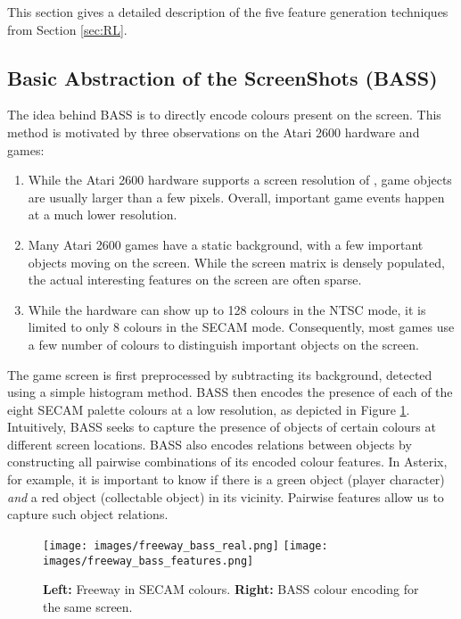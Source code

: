 \documentclass[twoside,11pt]{article}
\newcommand{\gamename}[1]{{\sc #1}}
\begin{document}
This section gives a detailed description of the five feature generation techniques from Section \ref{sec:RL}. 

\subsection{Basic Abstraction of the ScreenShots (BASS)}
\label{sec:agents:rl:bass}
The idea behind BASS is to directly encode colours present on the screen. This method is motivated by three observations on the Atari 2600 hardware and games:
\begin{enumerate}
	\item While the Atari 2600 hardware supports a screen resolution of , game objects are usually larger than a few pixels. Overall, important game events happen at a much lower resolution.
	\item Many Atari 2600 games have a static background, with a few important objects moving on the screen. While the screen matrix is densely populated, the actual interesting features on the screen are often sparse.  
	\item While the hardware can show up to 128 colours in the NTSC mode, it is limited to only 8 colours in the SECAM mode. Consequently, most games use a few number of colours to distinguish important objects on the screen. 
\end{enumerate}
The game screen is first preprocessed by subtracting its background, detected using a simple histogram method. BASS then encodes the presence of each of the eight SECAM palette colours at a low resolution, as depicted in Figure \ref{fig:agents:rl:bass:features}. Intuitively, BASS seeks to capture the presence of objects of certain colours at different screen locations. BASS also encodes relations between objects by constructing all pairwise combinations of its encoded colour features. In \gamename{Asterix}, for example, it is important to know if there is a green object (player character) \emph{and} a red object (collectable object) in its vicinity. Pairwise features allow us to capture such object relations.

\begin{figure}[h!]
\begin{center}
\texttt{[image: images/freeway\_bass\_real.png]}
\texttt{[image: images/freeway\_bass\_features.png]}
\caption{\textbf{Left:} Freeway in SECAM colours. \textbf{Right:} BASS colour encoding for the same screen. \label{fig:agents:rl:bass:features}}
\end{center}
\end{figure}
\end{document}
